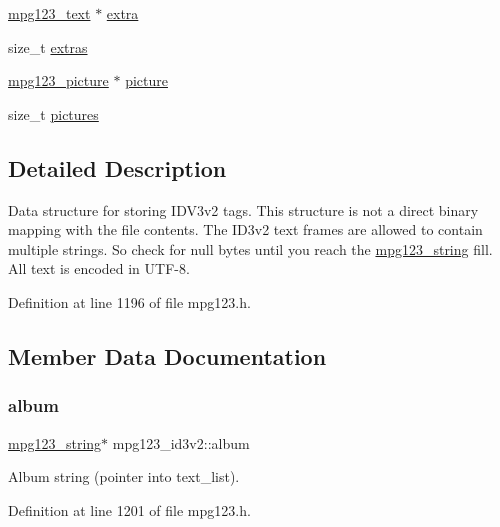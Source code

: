 \begin{DoxyCompactItemize}
\item 
\mbox{\hyperlink{structmpg123__text}{mpg123\+\_\+text}} $\ast$ \mbox{\hyperlink{structmpg123__id3v2_af11a6a5218b0616811349ee2efa8ece5}{extra}}
\item 
size\+\_\+t \mbox{\hyperlink{structmpg123__id3v2_afefe85eb6aea14e5463b83d4e8b9ef96}{extras}}
\item 
\mbox{\hyperlink{structmpg123__picture}{mpg123\+\_\+picture}} $\ast$ \mbox{\hyperlink{structmpg123__id3v2_ad2539ee2a294163a20ef2f67bc241d76}{picture}}
\item 
size\+\_\+t \mbox{\hyperlink{structmpg123__id3v2_ac13f50ac1a8d70b8be6580a71efc89b5}{pictures}}
\end{DoxyCompactItemize}


\subsection{Detailed Description}
Data structure for storing I\+D\+V3v2 tags. This structure is not a direct binary mapping with the file contents. The I\+D3v2 text frames are allowed to contain multiple strings. So check for null bytes until you reach the \mbox{\hyperlink{structmpg123__string}{mpg123\+\_\+string}} fill. All text is encoded in U\+T\+F-\/8. 

Definition at line 1196 of file mpg123.\+h.



\subsection{Member Data Documentation}
\mbox{\label{structmpg123__id3v2_adb45f4408f3e650dc70282060d631336}} 
\subsubsection{\texorpdfstring{album}{album}}
{\footnotesize\ttfamily \mbox{\hyperlink{structmpg123__string}{mpg123\+\_\+string}}$\ast$ mpg123\+\_\+id3v2\+::album}

Album string (pointer into text\+\_\+list). 

Definition at line 1201 of file mpg123.\+h.

\mbox{\label{structmpg123__id3v2_a5d269222d5c917356f337e999a38c1f3}} 
